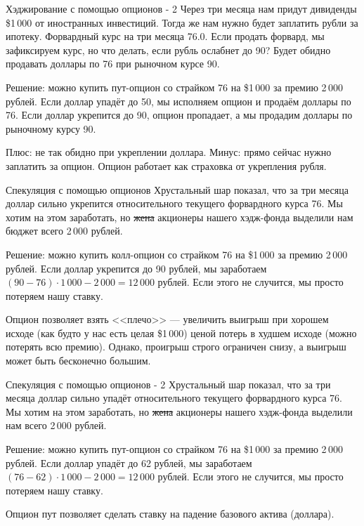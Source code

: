 \documentclass{beamer}
\begin{document}
\begin{frame}{Хэджирование с помощью опционов - 2}
\justify
Через три месяца нам придут дивиденды \$1\,000 от иностранных инвестиций. Тогда же нам нужно будет заплатить рубли за ипотеку. Форвардный курс на три месяца 76.0. Если продать форвард, мы зафиксируем курс, но что делать, если рубль ослабнет до 90? Будет обидно продавать доллары по 76 при рыночном курсе 90.

\justify
Решение: можно купить пут-опцион со страйком 76 на \$1\,000 за премию 2\,000 рублей. Если доллар упадёт до 50, мы исполняем опцион и продаём доллары по 76. Если доллар укрепится до 90, опцион пропадает, а мы продадим доллары по рыночному курсу 90.

\justify
Плюс: не так обидно при укреплении доллара. Минус: прямо сейчас нужно заплатить за опцион. Опцион работает как страховка от укрепления рубля.
\end{frame}



\begin{frame}{Спекуляция с помощью опционов}
\justify
Хрустальный шар показал, что за три месяца доллар сильно укрепится относительного текущего форвардного курса 76. Мы хотим на этом заработать, но \sout{жена} акционеры нашего хэдж-фонда выделили нам бюджет всего 2\,000 рублей.

\justify
Решение: можно купить колл-опцион со страйком 76 на \$1\,000 за премию 2\,000 рублей. Если доллар укрепится до 90 рублей, мы заработаем $(90 - 76) \cdot 1\,000 - 2\,000 = 12\,000$ рублей. Если этого не случится, мы просто потеряем нашу ставку.

\justify
Опцион позволяет взять <<плечо>> --- увеличить выигрыш при хорошем исходе (как будто у нас есть целая \$1\,000) ценой потерь в худшем исходе (можно потерять всю премию). Однако, проигрыш строго ограничен снизу, а выигрыш может быть бесконечно большим.
\end{frame}



\begin{frame}{Спекуляция с помощью опционов - 2}
\justify
Хрустальный шар показал, что за три месяца доллар сильно упадёт относительного текущего форвардного курса 76. Мы хотим на этом заработать, но \sout{жена} акционеры нашего хэдж-фонда выделили нам всего 2\,000 рублей.

\justify
Решение: можно купить пут-опцион со страйком 76 на \$1\,000 за премию 2\,000 рублей. Если доллар упадёт до 62 рублей, мы заработаем $(76 - 62) \cdot 1\,000 - 2\,000 = 12\,000$ рублей. Если этого не случится, мы просто потеряем нашу ставку.

\justify
Опцион пут позволяет сделать ставку на падение базового актива (доллара).
\end{frame}
\end{document}
